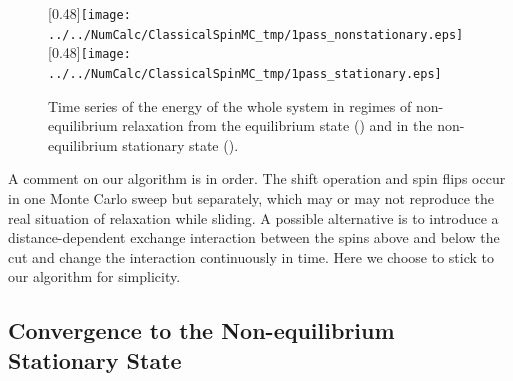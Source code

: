 \begin{figure}[htbp]
	\centering
	\subcaptionbox{\label{subcap:timeseries_ns}}[0.48\linewidth]{\texttt{[image: ../../NumCalc/ClassicalSpinMC\_tmp/1pass\_nonstationary.eps]}}
	\subcaptionbox{\label{subcap:timeseries_s}}[0.48\linewidth]{\texttt{[image: ../../NumCalc/ClassicalSpinMC\_tmp/1pass\_stationary.eps]}}
	
	\caption{Time series of the energy of the whole system in regimes of non-equilibrium relaxation from the equilibrium state () and in the non-equilibrium stationary state ().}
	\label{fig:timeseries}
\end{figure}
A comment on our algorithm is in order. The shift operation and spin flips occur in one Monte Carlo sweep but separately, which may or may not reproduce the real situation of relaxation while sliding. A possible alternative is to introduce a distance-dependent exchange interaction between the spins above and below the cut and change the interaction continuously in time. Here we choose to stick to our algorithm for simplicity.

\subsection{Convergence to the Non-equilibrium Stationary State}\label{subsec:convproof}

